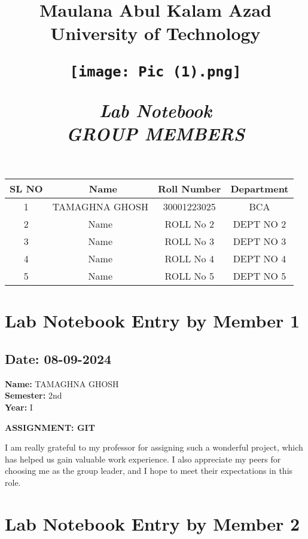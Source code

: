 \documentclass[12pt]{article}
\title{
    \vspace{0.2in}
    \Huge \textbf{Maulana Abul Kalam Azad University of Technology} \\
    \vspace{0.5in} %
    \begin{center}
        \texttt{[image: Pic (1).png]} %
    \end{center}
    \vspace{0.5in}
    \Huge\textbf{\textit{Lab Notebook}} \\
    \vspace{0.5in}
    \newpage
    \Large \textbf{\textit{GROUP MEMBERS}} \\
    \vspace{0.5in}
}
\date{}
\begin{document}
\maketitle

\begin{center}
    \begin{tabular}{|c| c | c | c |}
    \hline
    \textbf{SL NO}&\
    \textbf{Name} & \textbf{Roll Number} & \textbf{Department} \\
    \hline
     1 & TAMAGHNA GHOSH &30001223025 & BCA  \\
    \hline
     2& Name & ROLL No 2 &  DEPT NO 2 \\
    \hline
     3& Name & ROLL No 3 & DEPT NO  3   \\
    \hline
     4 &Name & ROLL No 4 & DEPT NO 4 \\
    \hline
     5 & Name & ROLL No 5 & DEPT NO 5 \\
    \hline
    \end{tabular}
\end{center}

\newpage

\section{Lab Notebook Entry by Member 1}
\subsection*{Date: 08-09-2024}

\begin{flushright}
\textbf{Name:} TAMAGHNA GHOSH \\
\textbf{Semester:} 2nd \\
\textbf{Year:} I \\
\end{flushright}

\begin{center}
\Huge \textbf{ASSIGNMENT: GIT}
\end{center}

I am really grateful to my professor for assigning such a wonderful project, which has helped us gain valuable work experience. I also appreciate my peers for choosing me as the group leader, and I hope to meet their expectations in this role.

\newpage

\section{Lab Notebook Entry by Member 2}
\end{document}
